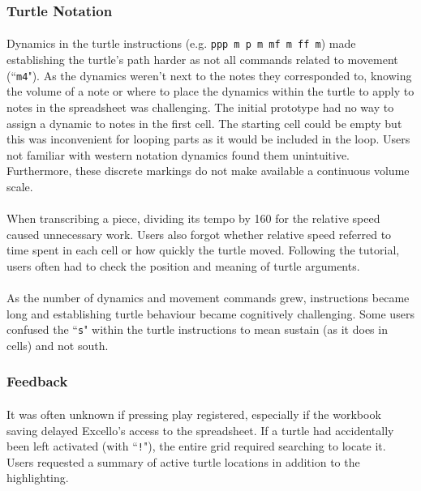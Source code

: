 \subsubsection{Turtle Notation}

\paragraph{} Dynamics in the turtle instructions (e.g. \texttt{ppp m p m mf m ff m}) made establishing the turtle's path harder as not all commands related to movement (``\texttt{m4}"). As the dynamics weren't next to the notes they corresponded to, knowing the volume of a note or where to place the dynamics within the turtle to apply to notes in the spreadsheet was challenging. The initial prototype had no way to assign a dynamic to notes in the first cell. The starting cell could be empty but this was inconvenient for looping parts as it would be included in the loop. Users not familiar with western notation dynamics found them unintuitive. Furthermore, these discrete markings do not make available a continuous volume scale.

\paragraph{} When transcribing a piece, dividing its tempo by 160 for the relative speed caused unnecessary work. Users also forgot whether relative speed referred to time spent in each cell or how quickly the turtle moved. Following the tutorial, users often had to check the position and meaning of turtle arguments.

\paragraph{} As the number of dynamics and movement commands grew, instructions became long and establishing turtle behaviour became cognitively challenging. Some users confused the ``\texttt{s}" within the turtle instructions to mean sustain (as it does in cells) and not south.

\subsubsection{Feedback}

\paragraph{} It was often unknown if pressing play registered, especially if the workbook saving delayed Excello's access to the spreadsheet. If a turtle had accidentally been left activated (with ``\texttt{!}"), the entire grid required searching to locate it. Users requested a summary of active turtle locations in addition to the highlighting.

